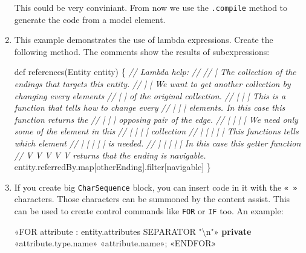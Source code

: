 \documentclass[]{report}
\newenvironment{Shaded}{}{}
\newcommand{\KeywordTok}[1]{\textcolor[rgb]{0.00,0.44,0.13}{\textbf{{#1}}}}
\newcommand{\CharTok}[1]{\textcolor[rgb]{0.25,0.44,0.63}{{#1}}}
\newcommand{\StringTok}[1]{\textcolor[rgb]{0.25,0.44,0.63}{{#1}}}
\newcommand{\CommentTok}[1]{\textcolor[rgb]{0.38,0.63,0.69}{\textit{{#1}}}}
\newcommand{\FunctionTok}[1]{\textcolor[rgb]{0.02,0.16,0.49}{{#1}}}
\newcommand{\NormalTok}[1]{{#1}}
\begin{document}
\begin{enumerate}
  This could be very conviniant. From now we use the \texttt{.compile}
  method to generate the code from a model element.
\item
  This example demonstrates the use of lambda expressions. Create the
  following method. The comments show the results of subexpressions:

\begin{Shaded}
\begin{Highlighting}[]
\NormalTok{def }\FunctionTok{references}\NormalTok{(Entity entity) \{}
    \CommentTok{// Lambda help:}
    \CommentTok{//   }
    \CommentTok{//     | The collection of the endings that targets this entity.}
    \CommentTok{//     |          | We want to get another collection by changing every elements}
    \CommentTok{//     |          | of the original collection.}
    \CommentTok{//     |          |   | This is a function that tells how to change every}
    \CommentTok{//     |          |   | elements. In this case this function returns the}
    \CommentTok{//     |          |   | opposing pair of the edge.}
    \CommentTok{//     |          |   |            | We need only some of the element in this }
    \CommentTok{//     |          |   |            | collection}
    \CommentTok{//     |          |   |            |      | This functions tells which element}
    \CommentTok{//     |          |   |            |      | is needed.}
    \CommentTok{//     |          |   |            |      | In this case this getter function}
    \CommentTok{//     V          V   V            V      V returns that the ending is navigable.}
    \NormalTok{entity.}\FunctionTok{referredBy}\NormalTok{.}\FunctionTok{map}\NormalTok{[otherEnding].}\FunctionTok{filter}\NormalTok{[navigable]}
\NormalTok{\}}
\end{Highlighting}
\end{Shaded}
\item
  If you create big \texttt{CharSequence} block, you can insert code in
  it with the \texttt{« »} characters. Those characters can be summoned
  by the content assist. This can be used to create control commands
  like \texttt{FOR} or \texttt{IF} too. An example:

\begin{Shaded}
\begin{Highlighting}[]
\NormalTok{«FOR attribute : entity.}\FunctionTok{attributes} \NormalTok{SEPARATOR }\StringTok{"}\CharTok{\textbackslash{}n}\StringTok{"}\NormalTok{»}
\KeywordTok{private} \NormalTok{«attribute.}\FunctionTok{type}\NormalTok{.}\FunctionTok{name}\NormalTok{» «attribute.}\FunctionTok{name}\NormalTok{»;}
\NormalTok{«ENDFOR»}
\end{Highlighting}
\end{Shaded}
\end{enumerate}
\end{document}

